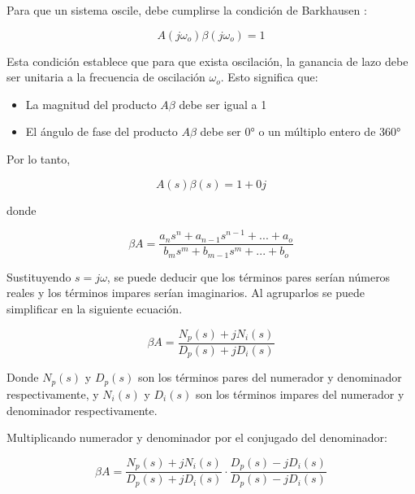 Para que un sistema oscile, debe cumplirse la condición de Barkhausen \cite{herrera-osciladores}:

\begin{equation}
  A(j\omega_o)\beta(j\omega_o) = 1
  \label{eq:condicion-barkhausen}
\end{equation}

Esta condición establece que para que exista oscilación, la ganancia de lazo debe ser unitaria a la frecuencia de oscilación $\omega_o$. Esto significa que:

\begin{itemize}
  \item La magnitud del producto $A\beta$ debe ser igual a 1
  \item El ángulo de fase del producto $A\beta$ debe ser 0° o un múltiplo entero de 360°
\end{itemize}

Por lo tanto,

\begin{equation}
  A(s)\beta(s) = 1 + 0j
  \label{eq:ganancia-oscilacion}
\end{equation}

donde

\begin{equation}
  \beta A = \frac{a_n s^n + a_{n-1} s^{n-1} + ... + a_o}{b_m s^m + b_{m-1} s^m + ... + b_o}
  \label{eq:ganancia-lazo}
\end{equation}

Sustituyendo $s = j\omega$, se puede deducir que los términos pares serían números reales y los términos impares serían imaginarios. Al agruparlos se puede simplificar en la siguiente ecuación.

\begin{equation}
  \beta A = \frac{N_p(s) + jN_i(s)}{D_p(s) + jD_i(s)}
  \label{eq:ganancia-lazo-simplificada}
\end{equation}

Donde $N_p(s)$ y $D_p(s)$ son los términos pares del numerador y denominador respectivamente, y $N_i(s)$ y $D_i(s)$ son los términos impares del numerador y denominador respectivamente.

Multiplicando numerador y denominador por el conjugado del denominador:

\begin{equation}
  \beta A = \frac{N_p(s) + jN_i(s)}{D_p(s) + jD_i(s)} \cdot \frac{D_p(s) - jD_i(s)}{D_p(s) - jD_i(s)}
  \label{eq:ganancia-lazo-conjugado}
\end{equation}

